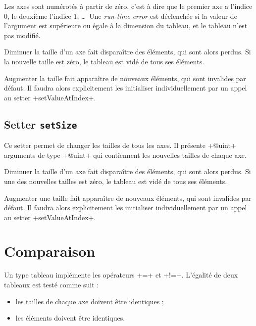 Les axes sont numérotés à partir de zéro, c'est à dire que le premier axe a l'indice $0$, le deuxième l'indice $1$, \dots~Une \emph{run-time error} est déclenchée si la valeur de l'argument est supérieure ou égale à la dimension du tableau, et le tableau n'est pas modifié.
 
Diminuer la taille d'un axe fait disparaître des éléments, qui sont alors perdus. Si la nouvelle taille est zéro, le tableau est vidé de tous ses éléments.

Augmenter la taille fait apparaître de nouveaux éléments, qui sont invalides par défaut. Il faudra alors explicitement les initialiser individuellement par un appel au setter \ggs+setValueAtIndex+.




\subsection{Setter \texttt{setSize}}

Ce setter permet de changer les tailles de tous les axes. Il présente \ggs+@uint+ arguments de type \ggs+@uint+ qui contiennent les nouvelles tailles de chaque axe.

Diminuer la taille d'un axe fait disparaître des éléments, qui sont alors perdus. Si une des nouvelles tailles est zéro, le tableau est vidé de tous ses éléments.

Augmenter une taille fait apparaître de nouveaux éléments, qui sont invalides par défaut. Il faudra alors explicitement les initialiser individuellement par un appel au setter \ggs+setValueAtIndex+.


\section{Comparaison}

Un type tableau implémente les opérateurs \ggs+=+ et \ggs+!=+. L'égalité de deux tableaux est testé comme suit :
\begin{itemize}
  \item les tailles de chaque axe doivent être identiques ;
  \item les éléments doivent être identiques.
\end {itemize}
